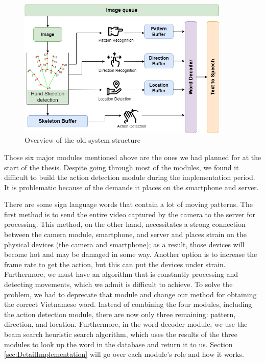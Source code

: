 \begin{figure}[H]
	\centering
	\includegraphics[width=0.9\textwidth]{img/Chap4/OverviewOfTheSystemModules-Old.png}
	\caption{Overview of the old system structure}
	\label{fig:Chap4-OverviewOfTheSystemModules-Old}
\end{figure}

Those six major modules mentioned above are the ones we had planned for at the start of the thesis. Despite going through most of the modules, we found it difficult to build the action detection module during the implementation period. It is problematic because of the demands it places on the smartphone and server.

There are some sign language words that contain a lot of moving patterns. The first method is to send the entire video captured by the camera to the server for processing. This method, on the other hand, necessitates a strong connection between the camera module, smartphone, and server and places strain on the physical devices (the camera and smartphone); as a result, those devices will become hot and may be damaged in some way. Another option is to increase the frame rate to get the action, but this can put the devices under strain. Furthermore, we must have an algorithm that is constantly processing and detecting movements, which we admit is difficult to achieve.
To solve the problem, we had to deprecate that module and change our method for obtaining the correct Vietnamese word. Instead of combining the four modules, including the action detection module, there are now only three remaining: pattern, direction, and location. Furthermore, in the word decoder module, we use the beam search heuristic search algorithm, which uses the results of the three modules to look up the word in the database and return it to us. Section \ref{sec:DetailImplementation} will go over each module's role and how it works.

